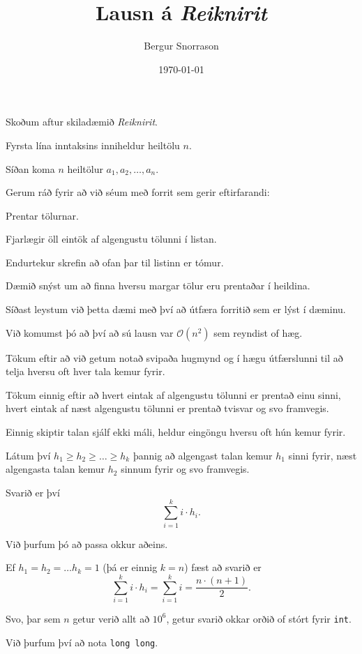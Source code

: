 \title{Lausn á \emph{Reiknirit}}
\author{Bergur Snorrason}
\date{\today}



\frame{\titlepage}

{
	{
		\item<1-> Skoðum aftur skiladæmið \emph{Reiknirit}.
		\item<2-> Fyrsta lína inntaksins inniheldur heiltölu $n$.
		\item<3-> Síðan koma $n$ heiltölur $a_1, a_2, \dots, a_n$.
		\item<4-> Gerum ráð fyrir að við séum með forrit sem gerir eftirfarandi:
		{
			\item<5-> Prentar tölurnar.
			\item<6-> Fjarlægir öll eintök af algengustu tölunni í listan.
			\item<7-> Endurtekur skrefin að ofan þar til listinn er tómur.
		}
		\item<8-> Dæmið snýst um að finna hversu margar tölur eru prentaðar í heildina.
	}
}

{
	{
		\item<1-> Síðast leystum við þetta dæmi með því að útfæra forritið sem er lýst í dæminu.
		\item<2-> Við komumst þó að því að sú lausn var $\mathcal{O}(n^2)$ sem reyndist of hæg.
		\item<3-> Tökum eftir að við getum notað svipaða hugmynd og í hægu útfærslunni til að telja hversu oft hver tala kemur fyrir.
		\item<4-> Tökum einnig eftir að hvert eintak af algengustu tölunni er prentað einu sinni,
					hvert eintak af næst algengustu tölunni er prentað tvisvar
					og svo framvegis.
		\item<5-> Einnig skiptir talan sjálf ekki máli, heldur eingöngu hversu oft hún kemur fyrir.
	}
}

{
	{
		\item<1-> Látum því $h_1 \geq h_2 \geq \dots \geq h_k$ þannig að algengast talan kemur $h_1$ sinni fyrir,
					næst algengasta talan kemur $h_2$ sinnum fyrir
					og svo framvegis.
		\item<2-> Svarið er því
		\[
			\sum_{i = 1}^k i \cdot h_i.
		\]
		\item<3-> Við þurfum þó að passa okkur aðeins.
		\item<4-> Ef $h_1 = h_2 = \dots h_k = 1$ (þá er einnig $k = n$) fæst að svarið er
		\[
			\sum_{i = 1}^k i \cdot h_i
			=
			\sum_{i = 1}^k i
			=
			\frac{n \cdot (n + 1)}{2}.
		\]
		\item<5-> Svo, þar sem $n$ getur verið allt að $10^6$, getur svarið okkar orðið of stórt fyrir \texttt{int}.
		\item<6-> Við þurfum því að nota \texttt{long long}.
	}
}

